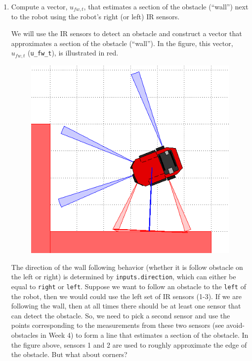 \documentclass[10pt]{article}
\begin{document}
\begin{enumerate}
	\item Compute a vector, $u_{fw,t}$, that estimates a section of the obstacle (``wall'') next to the robot using the robot's right (or left) IR sensors.
	
	We will use the IR sensors to detect an obstacle and construct a vector that approximates a section of the obstacle (``wall''). In the figure, this vector, $u_{fw,t}$ (\texttt{u\_fw\_t}), is illustrated in red.
	
	\begin{figure}[h]
		\centering
		\includegraphics[scale=0.5]{images/week-6-part-1.png}
		\label{fig:week6part1}
	\end{figure}
	
	The direction of the wall following behavior (whether it is follow obstacle on the left or right) is determined by \texttt{inputs.direction}, which can either be equal to \texttt{right} or \texttt{left}. Suppose we want to follow an obstacle to the \texttt{left} of the robot, then we would could use the left set of IR sensors (1-3). If we are following the wall, then at all times there should be at least one sensor that can detect the obstacle. So, we need to pick a second sensor and use the points corresponding to the measurements from these two sensors (see avoid-obstacles in Week 4) to form a line that estimates a section of the obstacle. In the figure above, sensors 1 and 2 are used to roughly approximate the edge of the obstacle. But what about corners?
	

\end{enumerate}
\end{document}
